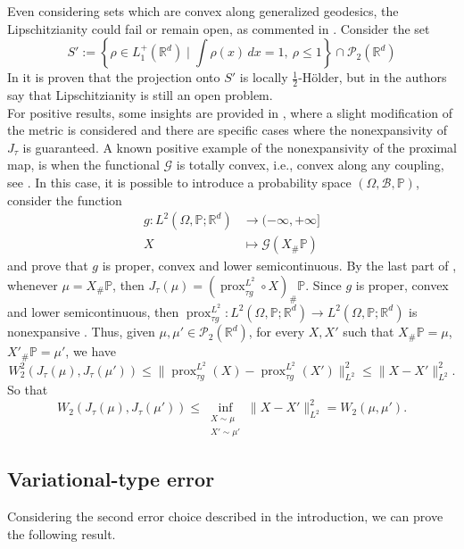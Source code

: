 \documentclass[11pt]{article}
\newcommand{\cP}{\mathcal{P}}
\newcommand{\cG}{\mathcal{G}}
\newcommand{\R}{\mathbb{R}}
\DeclareMathOperator{\prox}{prox}
\numberwithin{equation}{section}
\begin{document}
Even considering sets which are convex along generalized geodesics, the Lipschitzianity could fail or remain open, as commented in \cite{DePhilippis2016}. Consider the set
\[S' := \left\{\rho \in L_1^{+}(\R^d) \mid \int \rho(x) \, dx = 1, \ \rho \leq 1\right\}\cap \cP_2(\R^d)\]
In \cite[Corollary 5.3]{DePhilippis2016} it is proven that the projection onto $S'$ is locally $\frac{1}{2}$-H\"older, but in \cite[Remark 5.1]{DePhilippis2016} the authors say that Lipschitzianity is still an open problem.\\
For positive results, some insights are provided in \cite{CarlenCraig2013}, where a slight modification of the metric is considered and there are specific cases where the nonexpansivity of $J_{\tau}$ is guaranteed. A known positive example of the nonexpansivity of the proximal map, is when the functional $\cG$ is totally convex, i.e., convex along any coupling, see \cite[Definition 2.7]{CSS_2023}. In this case, it is possible to introduce a probability space $(\Omega, \mathcal{B},\mathbb{P})$, consider the function \[\begin{aligned}
g: L^2(\Omega, \mathbb{P};\mathbb{R}^d) & \to (-\infty, +\infty] \\
X & \mapsto \mathcal{G}( X_{\#} \mathbb{P} )\end{aligned}\] and prove that $g$ is proper, convex and lower semicontinuous. By the last part of \cite[Proposition 5.2 (1)]{CSS_2023}, whenever $\mu = X_{\#}\mathbb{P}$, then $J_{\tau}(\mu)=(\prox_{\tau g}^{L^2} \circ X)_{\#}\mathbb{P}$. Since $g$ is proper, convex and lower semicontinuous, then $\prox_{\tau g}^{L^2}:L^2(\Omega,\mathbb{P};\R^d)\to L^2(\Omega,\mathbb{P};\R^d)$ is nonexpansive \cite[Proposition 12.28]{BCombettes}. Thus, given $\mu, \mu'\in \cP_2(\R^d)$, for every $X,X'$ such that $X_{\#}\mathbb{P}= \mu$, $X'_{\#}\mathbb{P}= \mu'$, we have
\[W_2^2(J_{\tau}(\mu),J_{\tau}(\mu'))\leq \|\prox_{\tau g}^{L^2}(X)-\prox_{\tau g}^{L^2}(X')\|_{L^2}^2\leq \|X-X'\|_{L^2}^2.\]
So that
\[W_2(J_{\tau}(\mu),J_{\tau}(\mu'))\leq \inf_{\substack{X \sim \mu \\ X' \sim \mu'}} \|X - X'\|_{L^2}^2 = W_2(\mu,\mu').\]


\subsection{Variational-type error}\label{sec:second_error}

Considering the second error choice described in the introduction, we can prove the following result.
\end{document}
